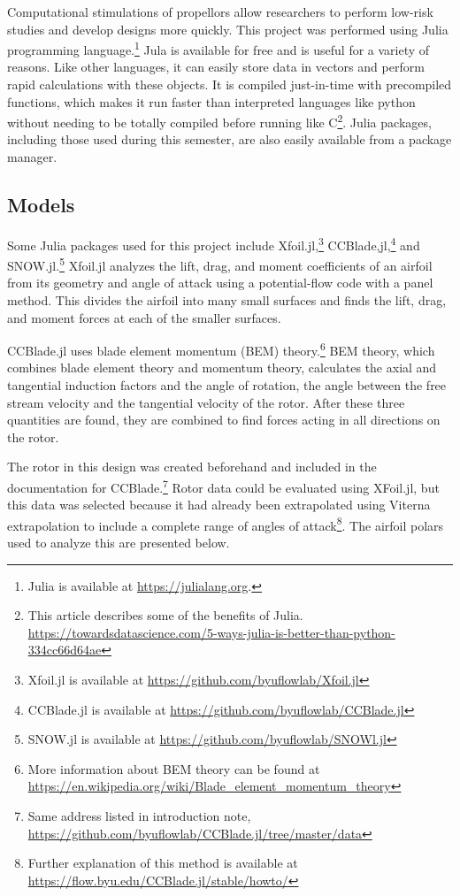 \documentclass[journal ]{new-aiaa}
\begin{document}
Computational stimulations of propellors allow researchers to perform low-risk studies and develop designs more quickly. This project was performed using Julia programming language.\footnote{Julia is available at \url{https://julialang.org}.} Jula is available for free and is useful for a variety of reasons. Like other languages, it can easily store data in vectors and perform rapid calculations with these objects. It is compiled just-in-time with precompiled functions, which makes it run faster than interpreted languages like python without needing to be totally compiled before running like C\footnote{This article describes some of the benefits of Julia. \url{https://towardsdatascience.com/5-ways-julia-is-better-than-python-334cc66d64ae}}. Julia  packages, including those used during this semester, are also easily available from a package manager.

\subsection{Models}

Some Julia packages used for this project include Xfoil.jl,\footnote{Xfoil.jl is available at \url{https://github.com/byuflowlab/Xfoil.jl}} CCBlade,jl,\footnote{CCBlade.jl is available at \url{https://github.com/byuflowlab/CCBlade.jl}} and SNOW.jl.\footnote{SNOW.jl is available at \url{https://github.com/byuflowlab/SNOWl.jl}} Xfoil.jl analyzes the lift, drag, and moment coefficients of an airfoil from its geometry and angle of attack using a potential-flow code with a panel method. This divides the airfoil into many small surfaces and finds the lift, drag, and moment forces at each of the smaller surfaces. 

CCBlade.jl uses blade element momentum (BEM) theory.\footnote{More information about BEM theory can be found at \url{https://en.wikipedia.org/wiki/Blade_element_momentum_theory}} BEM theory, which combines blade element theory and momentum theory, calculates the axial and tangential induction factors and the angle of rotation, the angle between the free stream velocity and the tangential velocity of the rotor. After these three quantities are found, they are combined to find forces acting in all directions on the rotor\cite{CCBlade}.

The rotor in this design was created beforehand and included in the documentation for CCBlade.\footnote{Same address listed in introduction note, \url{https://github.com/byuflowlab/CCBlade.jl/tree/master/data}} Rotor data could be evaluated using XFoil.jl, but this data was selected because it had already been extrapolated using Viterna extrapolation to include a complete range of angles of attack\footnote{Further explanation of this method is available at \url{https://flow.byu.edu/CCBlade.jl/stable/howto/}}. The airfoil polars used to analyze this are presented below. 
\end{document}
